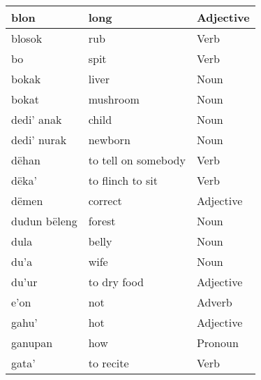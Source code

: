 \documentclass{article}
\begin{document}
\begin{longtable}{|l|l|l|}
blon                    & long                & {\color[HTML]{009901} Adjective}                   \\ \hline
blosok                  & rub                 & {\color[HTML]{009901} Verb}                        \\ \hline
bo                      & spit                & {\color[HTML]{009901} Verb}                        \\ \hline
bokak                   & liver               & {\color[HTML]{009901} Noun}                        \\ \hline
bokat                   & mushroom            & {\color[HTML]{009901} Noun}                        \\ \hline
dedi' anak              & child               & {\color[HTML]{009901} Noun}                        \\ \hline
dedi' nurak             & newborn             & {\color[HTML]{009901} Noun}                        \\ \hline
dëhan                   & to tell on somebody & {\color[HTML]{009901} Verb}                        \\ \hline
dëka'                   & to flinch to sit    & {\color[HTML]{009901} Verb}                        \\ \hline
dëmen                   & correct             & {\color[HTML]{009901} Adjective}                   \\ \hline
dudun bëleng            & forest              & {\color[HTML]{009901} Noun}                        \\ \hline
dula                    & belly               & {\color[HTML]{009901} Noun}                        \\ \hline
du'a                    & wife                & {\color[HTML]{009901} Noun}                        \\ \hline
du'ur                   & to dry food         & {\color[HTML]{009901} Adjective}                   \\ \hline
e'on                    & not                 & {\color[HTML]{009901} Adverb}                      \\ \hline
gahu'                   & hot                 & {\color[HTML]{009901} Adjective}                   \\ \hline
ganupan                 & how                 & {\color[HTML]{009901} Pronoun}                     \\ \hline
gata'                   & to recite           & {\color[HTML]{009901} Verb}                        \\ \hline

\end{longtable}
\end{document}
